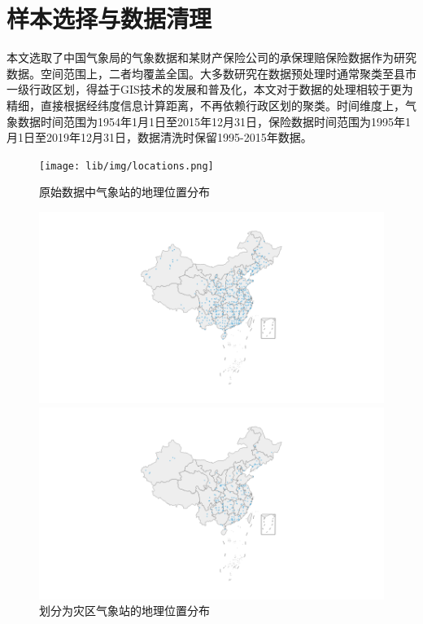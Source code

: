 \section{样本选择与数据清理}\label{sec:data}

本文选取了中国气象局的气象数据和某财产保险公司的承保理赔保险数据作为研究数据。空间范围上，二者均覆盖全国。大多数研究在数据预处理时通常聚类至县市一级行政区划\citep{0Do,杨娜娜2019自然灾害与企业现金持有}，得益于GIS技术的发展和普及化，本文对于数据的处理相较于更为精细，直接根据经纬度信息计算距离，不再依赖行政区划的聚类。时间维度上，气象数据时间范围为1954年1月1日至2015年12月31日，保险数据时间范围为1995年1月1日至2019年12月31日，数据清洗时保留1995-2015年数据。

\begin{figure}[H]
    \centering
    \begin{minipage}{0.48\linewidth}
        \texttt{[image: lib/img/locations.png]}
        \caption{原始数据中气象站的地理位置分布}
        \label{fig:location}
    \end{minipage}
    \begin{minipage}{0.48\linewidth}
        \includegraphics[width=\textwidth, trim=200 0 200 0]{lib/img/near.png}
        \caption{划分为灾区气象站的地理位置分布}
    \end{minipage}
    \begin{minipage}{0.48\linewidth}
        \includegraphics[width=\textwidth, trim=200 0 200 0]{lib/img/middle.png}

\end{minipage}
\end{figure}
